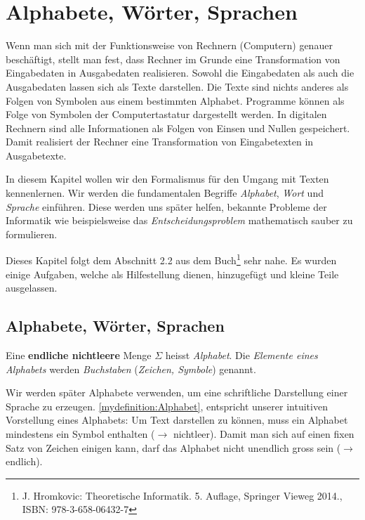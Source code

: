 \chapter{Alphabete, Wörter, Sprachen}
Wenn man sich mit der Funktionsweise von Rechnern (Computern) genauer beschäftigt, stellt man fest, dass Rechner im Grunde eine Transformation von Eingabedaten in Ausgabedaten realisieren. Sowohl die Eingabedaten als auch die Ausgabedaten lassen sich als Texte darstellen. Die Texte sind nichts anderes als Folgen von Symbolen aus einem bestimmten Alphabet. Programme können als Folge von Symbolen der Computertastatur dargestellt werden. In digitalen Rechnern sind alle Informationen als Folgen von Einsen und Nullen gespeichert. Damit realisiert der Rechner eine Transformation von Eingabetexten in Ausgabetexte.

In diesem Kapitel wollen wir den Formalismus für den Umgang mit Texten kennenlernen. Wir werden die fundamentalen Begriffe \textit{Alphabet}, \textit{Wort} und \textit{Sprache} einführen. Diese werden uns später helfen, bekannte Probleme der Informatik wie beispielsweise das \textit{Entscheidungsproblem} mathematisch sauber zu formulieren.

Dieses Kapitel folgt dem Abschnitt 2.2 aus dem Buch\footnote{J. Hromkovic: Theoretische Informatik. 5. Auflage, Springer Vieweg 2014., ISBN: 978-3-658-06432-7} sehr  nahe. Es wurden einige Aufgaben, welche als Hilfestellung dienen, hinzugefügt und kleine Teile ausgelassen.

\section{Alphabete, Wörter, Sprachen}
\begin{mydefinition}[Alphabet]\label{mydefinition:Alphabet}
Eine \textbf{endliche nichtleere} Menge $\Sigma$ heisst \textit{Alphabet}. Die \textit{Elemente eines Alphabets} werden \textit{Buchstaben} (\textit{Zeichen, Symbole}) genannt.
\end{mydefinition}
Wir werden später Alphabete verwenden, um eine schriftliche Darstellung einer Sprache zu erzeugen. \cref{mydefinition:Alphabet}, entspricht unserer intuitiven Vorstellung eines Alphabets:
Um Text darstellen zu können, muss ein Alphabet mindestens ein Symbol enthalten ($\to$ nichtleer). Damit man sich auf einen fixen Satz von Zeichen einigen kann, darf das Alphabet nicht unendlich gross sein ($\to$ endlich).

